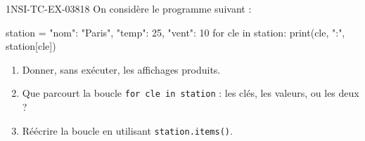 \begin{exercice}{1NSI-TC-EX-038}{1}{8}
On considère le programme suivant :
\begin{python}
station = {"nom": "Paris", "temp": 25, "vent": 10}
for cle in station:
    print(cle, ":", station[cle])
\end{python}
\begin{enumerate}
  \item Donner, sans exécuter, les affichages produits.
  \item Que parcourt la boucle \lstinline{for cle in station} : les clés, les valeurs,
        ou les deux ?
  \item Réécrire la boucle en utilisant \lstinline{station.items()}.
\end{enumerate}
\end{exercice}
